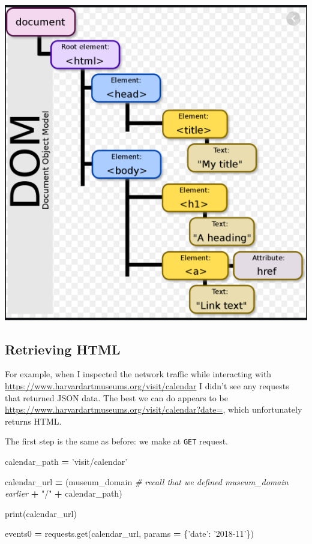 \documentclass[]{book}
\newenvironment{Shaded}{\begin{snugshade}}{\end{snugshade}}
\newcommand{\BuiltInTok}[1]{#1}
\newcommand{\CommentTok}[1]{\textcolor[rgb]{0.56,0.35,0.01}{\textit{#1}}}
\newcommand{\NormalTok}[1]{#1}
\newcommand{\OperatorTok}[1]{\textcolor[rgb]{0.81,0.36,0.00}{\textbf{#1}}}
\newcommand{\StringTok}[1]{\textcolor[rgb]{0.31,0.60,0.02}{#1}}
\begin{document}
\includegraphics{Python/PythonWebScrape/images/DOM.png}

\hypertarget{retrieving-html}{%
\subsection{Retrieving HTML}\label{retrieving-html}}

For example, when I inspected the network traffic while interacting
with \url{https://www.harvardartmuseums.org/visit/calendar} I didn't see
any requests that returned JSON data. The best we can do appears to be
\url{https://www.harvardartmuseums.org/visit/calendar?date=}, which
unfortunately returns HTML.

The first step is the same as before: we make at \texttt{GET} request.

\begin{Shaded}
\begin{Highlighting}[]
\NormalTok{calendar_path }\OperatorTok{=} \StringTok{'visit/calendar'}

\NormalTok{calendar_url }\OperatorTok{=}\NormalTok{ (museum_domain }\CommentTok{# recall that we defined museum_domain earlier}
                  \OperatorTok{+} \StringTok{"/"}
                  \OperatorTok{+}\NormalTok{ calendar_path)}

\BuiltInTok{print}\NormalTok{(calendar_url)}

\NormalTok{events0 }\OperatorTok{=}\NormalTok{ requests.get(calendar_url, params }\OperatorTok{=}\NormalTok{ \{}\StringTok{'date'}\NormalTok{: }\StringTok{'2018-11'}\NormalTok{\})}
\end{Highlighting}
\end{Shaded}
\end{document}
